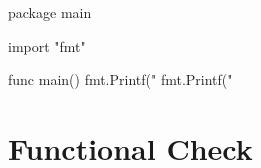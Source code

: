 \begin{code}
    \label{code:fold-go}
\begin{gocode}
package main

import "fmt"

func main() {
        fmt.Printf("%
        fmt.Printf("%
}
\end{gocode}
\end{code}

\section{Functional Check}
